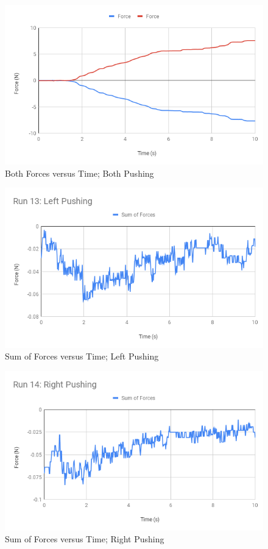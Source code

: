 \begin{figure}[ht]
    \centering
    \includegraphics[scale=0.71]{image/05-third-law/Run-15-Both.png}
    \caption{Both Forces versus Time; Both Pushing}
    \label{figure:05.ff.B}
\end{figure}
%
\begin{figure}[ht]
    \centering
    \includegraphics[scale=0.71]{image/05-third-law/Run-13-Left-Pushing.png}
    \caption{Sum of Forces versus Time; Left Pushing}
    \label{figure:05.sf.L}
\end{figure}
%
\begin{figure}[ht]
    \centering
    \includegraphics[scale=0.71]{image/05-third-law/Run-14-Right-Pushing.png}
    \caption{Sum of Forces versus Time; Right Pushing}
    \label{figure:05.sf.R}
\end{figure}
